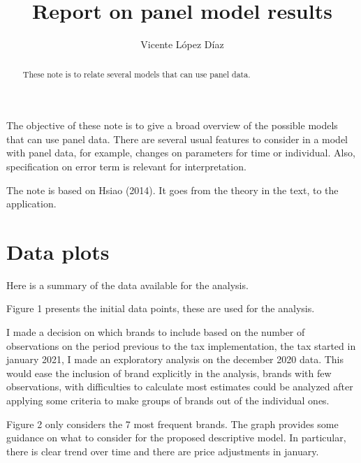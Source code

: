 \documentclass[]{article}
\title{Report on panel model results}
\author{Vicente López Díaz}
\begin{document}
\maketitle


\begin{abstract}
These note is to relate several models that can use panel data.
\end{abstract}

The objective of these note is to give a broad overview of the possible models that can use panel data. There are several usual features to consider in a model with panel data, for example, changes on parameters for time or individual. Also, specification on error term is relevant for interpretation.

The note is based on Hsiao (2014). It goes from the theory in the text, to the application.

\section{Data plots}
Here is a summary of the data available for the analysis. 

Figure 1 presents the initial data points, these are used for the analysis.

I made a decision on which brands to include based on the number of observations on the period previous to the tax implementation, the tax started in january 2021, I made an exploratory analysis on the december 2020 data. This would ease the inclusion of brand explicitly in the analysis, brands with few observations, with difficulties to calculate most estimates could be analyzed after applying some criteria to make groups of brands out of the individual ones.



Figure 2 only considers the 7 most frequent brands. The graph provides some guidance on what to consider for the proposed descriptive model.  In particular, there is clear trend over time and there are price adjustments in january. 

\end{document}
